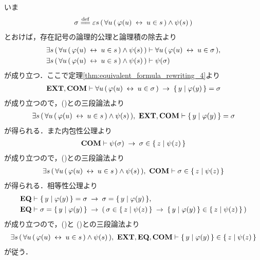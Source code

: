 	\begin{sketch}
		いま
		\begin{align}
			\sigma \defeq \varepsilon s\, (\, \forall u\, (\, \varphi(u) \lrarrow u \in s\, ) \wedge \psi(s)\, )
		\end{align}
		とおけば，存在記号の論理的公理と論理積の除去より
		\begin{align}
			\exists s\, (\, \forall u\, (\, \varphi(u) \hspace{0.25em}\leftrightarrow\hspace{0.25em} u \in s\, ) \wedge \psi(s)\, )
			&\vdash \forall u\, (\, \varphi(u) \hspace{0.25em}\leftrightarrow\hspace{0.25em} u \in \sigma\, ), 
			\label{fom:equivalent_formula_rewriting_12_1} \\
			\exists s\, (\, \forall u\, (\, \varphi(u) \hspace{0.25em}\leftrightarrow\hspace{0.25em} u \in s\, ) \wedge \psi(s)\, )
			&\vdash \psi(\sigma)
			\label{fom:equivalent_formula_rewriting_12_2}
		\end{align}
		が成り立つ．ここで定理\ref{thm:equivalent_formula_rewriting_4}より
		\begin{align}
			\mbox{{\bf EXT}},\mbox{\bf COM} \vdash \forall u\, (\, \varphi(u) \hspace{0.25em}\leftrightarrow\hspace{0.25em} u \in \sigma\, )
			\hspace{0.25em}\rightarrow\hspace{0.25em} \{\, y \mid \varphi(y)\, \} = \sigma
		\end{align}
		が成り立つので，()との三段論法より
		\begin{align}
			\exists s\, (\, \forall u\, (\, \varphi(u) \hspace{0.25em}\leftrightarrow\hspace{0.25em} u \in s\, ) \wedge \psi(s)\, ),\ \mbox{{\bf EXT}},\mbox{\bf COM} \vdash \{\, y \mid \varphi(y)\, \} = \sigma
			\label{fom:equivalent_formula_rewriting_12_3}
		\end{align}
		が得られる．また内包性公理より
		\begin{align}
			\mbox{\bf COM} \vdash \psi(\sigma) \hspace{0.25em}\rightarrow\hspace{0.25em} \sigma \in \{\, z \mid \psi(z)\, \}
		\end{align}
		が成り立つので，()との三段論法より
		\begin{align}
			\exists s\, (\, \forall u\, (\, \varphi(u) \hspace{0.25em}\leftrightarrow\hspace{0.25em} u \in s\, ) \wedge \psi(s)\, ),\ \mbox{\bf COM} \vdash \sigma \in \{\, z \mid \psi(z)\, \}
			\label{fom:equivalent_formula_rewriting_12_4}
		\end{align}
		が得られる．相等性公理より
		\begin{align}
			\mbox{{\bf EQ}} &\vdash \{\, y \mid \varphi(y)\, \} = \sigma \hspace{0.25em}\rightarrow\hspace{0.25em} \sigma = \{\, y \mid \varphi(y)\, \}, \\
			\mbox{{\bf EQ}} &\vdash \sigma = \{\, y \mid \varphi(y)\, \} \hspace{0.25em}\rightarrow\hspace{0.25em}
			(\, \sigma \in \{\, z \mid \psi(z)\, \} \hspace{0.25em}\rightarrow\hspace{0.25em} \{\, y \mid \varphi(y)\, \} \in \{\, z \mid \psi(z)\, \}\, )
		\end{align}
		が成り立つので，()と
		()との三段論法より
		\begin{align}
			\exists s\, (\, \forall u\, (\, \varphi(u) \hspace{0.25em}\leftrightarrow\hspace{0.25em} u \in s\, ) \wedge \psi(s)\, ),\ \mbox{{\bf EXT}},\mbox{{\bf EQ}},\mbox{\bf COM} \vdash \{\, y \mid \varphi(y)\, \} \in \{\, z \mid \psi(z)\, \}
		\end{align}
		が従う．
		\QED
	\end{sketch}